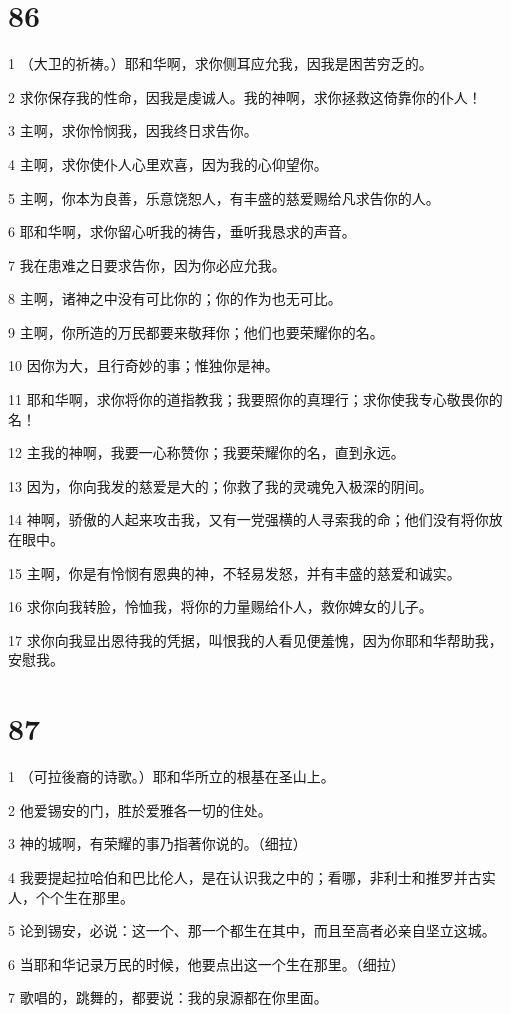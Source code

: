 \chapter{86}

\par 1 （大卫的祈祷。）耶和华啊，求你侧耳应允我，因我是困苦穷乏的。
\par 2 求你保存我的性命，因我是虔诚人。我的神啊，求你拯救这倚靠你的仆人！
\par 3 主啊，求你怜悯我，因我终日求告你。
\par 4 主啊，求你使仆人心里欢喜，因为我的心仰望你。
\par 5 主啊，你本为良善，乐意饶恕人，有丰盛的慈爱赐给凡求告你的人。
\par 6 耶和华啊，求你留心听我的祷告，垂听我恳求的声音。
\par 7 我在患难之日要求告你，因为你必应允我。
\par 8 主啊，诸神之中没有可比你的；你的作为也无可比。
\par 9 主啊，你所造的万民都要来敬拜你；他们也要荣耀你的名。
\par 10 因你为大，且行奇妙的事；惟独你是神。
\par 11 耶和华啊，求你将你的道指教我；我要照你的真理行；求你使我专心敬畏你的名！
\par 12 主我的神啊，我要一心称赞你；我要荣耀你的名，直到永远。
\par 13 因为，你向我发的慈爱是大的；你救了我的灵魂免入极深的阴间。
\par 14 神啊，骄傲的人起来攻击我，又有一党强横的人寻索我的命；他们没有将你放在眼中。
\par 15 主啊，你是有怜悯有恩典的神，不轻易发怒，并有丰盛的慈爱和诚实。
\par 16 求你向我转脸，怜恤我，将你的力量赐给仆人，救你婢女的儿子。
\par 17 求你向我显出恩待我的凭据，叫恨我的人看见便羞愧，因为你耶和华帮助我，安慰我。

\chapter{87}

\par 1 （可拉後裔的诗歌。）耶和华所立的根基在圣山上。
\par 2 他爱锡安的门，胜於爱雅各一切的住处。
\par 3 神的城啊，有荣耀的事乃指著你说的。（细拉）
\par 4 我要提起拉哈伯和巴比伦人，是在认识我之中的；看哪，非利士和推罗并古实人，个个生在那里。
\par 5 论到锡安，必说：这一个、那一个都生在其中，而且至高者必亲自坚立这城。
\par 6 当耶和华记录万民的时候，他要点出这一个生在那里。（细拉）
\par 7 歌唱的，跳舞的，都要说：我的泉源都在你里面。

